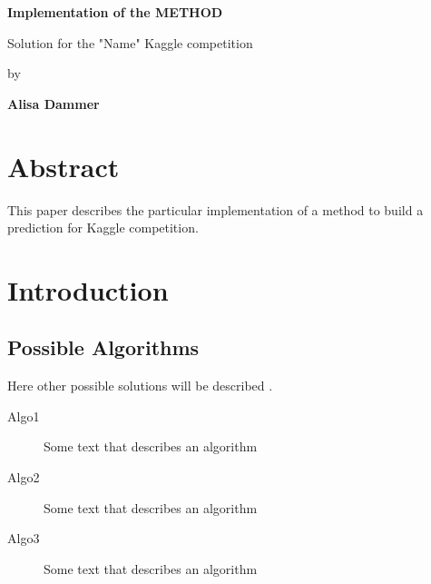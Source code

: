 \documentclass[
  twoside,
  11pt, a4paper,
  footinclude=true,
  headinclude=true,
  cleardoublepage=empty
]{scrreprt}
\begin{document}
    \begin{titlepage}
        \begin{center}
            \vspace{2.5cm}
            
            \LARGE
            \textbf{Implementation of the METHOD}
            
            \vspace{2.5cm}
            
            \normalsize
            Solution for the "Name" Kaggle competition

            
            \vspace{0.6cm}

            by

            \vspace{0.6cm}
            
            \large
            \textbf{Alisa Dammer}\\
            
        \end{center}
    \end{titlepage}

    \chapter*{Abstract}
        \onehalfspace
        This paper describes the particular implementation of a method to build a prediction for Kaggle competition.
        \singlespace

    \tableofcontents

    \chapter{Introduction}
        \section{Possible Algorithms}
            Here other possible solutions will be described \cite{wiki:latex}.
            \begin{description}
                \item[Algo1] Some text that describes an algorithm
                \item[Algo2] Some text that describes an algorithm
                \item[Algo3] Some text that describes an algorithm
            \end{description}
\end{document}
